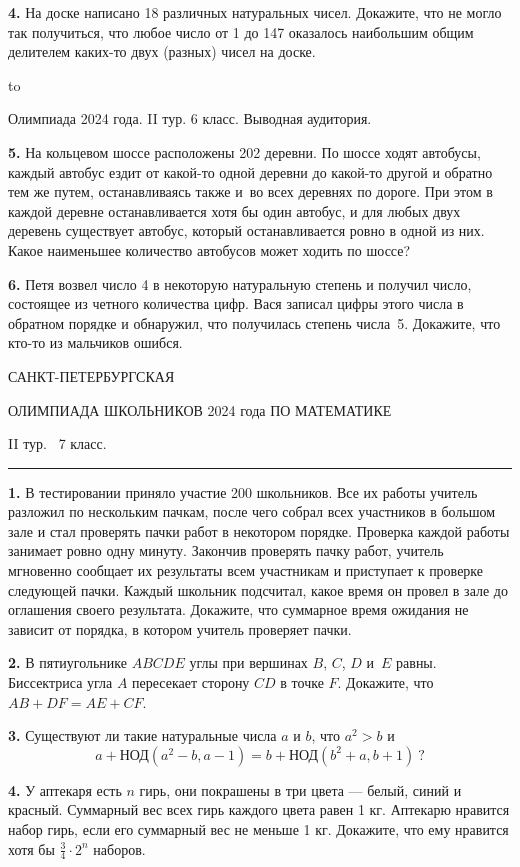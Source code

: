 \documentclass[12pt]{article}
\def\q#1.{{\bf #1. }}
\def\dotline{\smallskip\hbox to \hsize{\dotfill}\medskip}
\begin{document}
\q4. На доске написано 18 различных натуральных чисел. Докажите, что не могло так получиться, что любое число от 1 до 147 оказалось наибольшим общим делителем каких-то двух (разных) чисел на доске.

\dotline

\centerline{Олимпиада 2024 года. II тур. 6 класс. Выводная аудитория.}
\smallskip

\q5. На кольцевом шоссе расположены 202 деревни. По шоссе ходят 
автобусы, каждый автобус ездит от какой-то одной деревни до какой-то 
другой и обратно тем же путем, останавливаясь также и~во всех деревнях по дороге. 
При этом в каждой деревне останавливается хотя бы один автобус, и для любых 
двух деревень существует автобус, который останавливается ровно в одной из 
них. Какое наименьшее количество автобусов может ходить по шоссе?

\q6. Петя возвел число 4 в некоторую натуральную степень и получил число,
состоящее из четного количества цифр. Вася записал цифры этого числа в 
обратном порядке и обнаружил, что получилась степень числа~5. Докажите, 
что кто-то из мальчиков ошибся.


\clearpage

\centerline{\sc САНКТ-ПЕТЕРБУРГСКАЯ}
\centerline{\sc ОЛИМПИАДА ШКОЛЬНИКОВ 2024 года ПО МАТЕМАТИКЕ}
\centerline{\sc II тур. \ 7 класс.}
\medskip
\hrule
\medskip

\q1. В тестировании приняло участие 200 школьников. Все их работы учитель разложил по нескольким пачкам, после чего собрал всех участников в большом зале и стал проверять пачки работ в некотором порядке. Проверка каждой работы занимает ровно одну минуту. Закончив проверять пачку работ, учитель мгновенно сообщает их результаты всем участникам и приступает к проверке следующей пачки. Каждый школьник подсчитал, какое время он провел в зале до оглашения своего результата. Докажите, что суммарное время ожидания не зависит от порядка, в котором учитель проверяет пачки.

\q2. В пятиугольнике $ABCDE$ углы при вершинах $B$, $C$, $D$ и~$E$ равны. Биссектриса угла $A$ пересекает сторону $CD$ в точке $F$. Докажите, что $AB+DF = AE+CF$. 

\q3. Существуют ли такие натуральные числа $a$ и $b$, что $a^2>b$ и 
$$
a+\text{НОД}(a^2-b, a-1) = b+ \text{НОД}(b^2+a, b+1)\ ?
$$

\q4. У аптекаря есть $n$ гирь, они покрашены в три цвета --- белый, синий и красный. 
Суммарный вес всех гирь каждого цвета равен 1 кг. %
Аптекарю нравится набор гирь, если его суммарный вес не меньше 1 кг. Докажите, что ему нравится хотя бы $\frac{3}{4} \cdot 2^n$ наборов.
\end{document}
